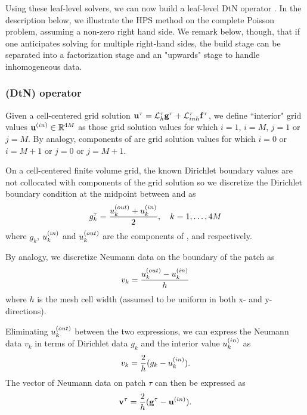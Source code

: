 Using these leaf-level solvers, we can now build a leaf-level DtN operator \Ttau.  In the description below, we illustrate the HPS method on the complete Poisson problem, assuming a non-zero right hand side.  We remark below, though, that if one anticipates solving for multiple right-hand sides, the build stage can be separated into a factorization stage and an "upwards" stage to handle inhomogeneous data.  


\subsubsection{\DtN (DtN) operator}
Given a cell-centered grid solution $\mathbf u^{\tau} = \mathcal L_h^{\tau} \mathbf g^{\tau} + \mathcal L_{inh}^{\tau} \mathbf f^{\tau}$, we define ``interior" grid values $\mathbf u^{(in)} \in \mathbb R^{4M}$ as those grid solution values \utau for which $i = 1$, $i = M$, $j = 1$ or $j = M$.  By analogy, components of \uout are grid solution values for which $i=0$ or $i = M+1$ or $j = 0$ or $j = M+1$.     

On a cell-centered finite volume grid, the known Dirichlet boundary values are not collocated with components of the grid solution so we discretize the Dirichlet boundary condition at the midpoint between \ukin and \ukout as
\begin{equation}
g_k^\tau = \frac{u_k^{(out)} + u_k^{(in)}}{2}, \quad k = 1,\hdots , 4M
\end{equation}
where $g_k$, $u_k^{(in)}$ and $u_k^{(out)}$ are the components of \gtau, \uin and \uout respectively.  

By analogy, we discretize Neumann data on the boundary of the patch as
\begin{equation}
v_k = \frac{u_k^{(out)} - u_k^{(in)}}{h}
\end{equation}
where $h$ is the mesh cell width (assumed to be uniform in both x- and y- directions).

Eliminating $u_k^{(out)}$  between the two expressions, we  can express the Neumann data $v_k$ in terms of Dirichlet data $g_k$ and the interior value $u_k^{(in)}$ as
\begin{equation}
v_k = \frac{2}{h}(g_k - u_k^{(in)}).
\end{equation}
The vector of Neumann data on patch $\tau$ can then be expressed as 
\begin{equation}
\mathbf v^{\tau} = \frac{2}{h}(\mathbf g^{\tau} - \mathbf u^{(in)}).
\end{equation}   

